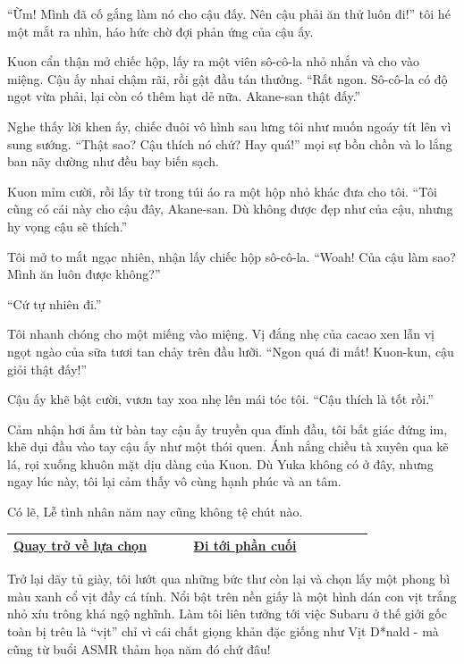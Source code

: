 \documentclass[../main.tex]{subfiles}
\begin{document}
``Ừm! Mình đã cố gắng làm nó cho cậu đấy. Nên cậu phải ăn thử luôn đi!'' tôi hé một mắt ra nhìn, háo hức chờ đợi phản ứng của cậu ấy.

Kuon cẩn thận mở chiếc hộp, lấy ra một viên sô-cô-la nhỏ nhắn và cho vào miệng. Cậu ấy nhai chậm rãi, rồi gật đầu tán thưởng. ``Rất ngon. Sô-cô-la có độ ngọt vừa phải, lại còn có thêm hạt dẻ nữa. Akane-san thật đấy.''

Nghe thấy lời khen ấy, chiếc đuôi vô hình sau lưng tôi như muốn ngoáy tít lên vì sung sướng. ``Thật sao? Cậu thích nó chứ? Hay quá!'' mọi sự bồn chồn và lo lắng ban nãy dường như đều bay biến sạch.

Kuon mỉm cười, rồi lấy từ trong túi áo ra một hộp nhỏ khác đưa cho tôi. ``Tôi cũng có cái này cho cậu đây, Akane-san. Dù không được đẹp như của cậu, nhưng hy vọng cậu sẽ thích.''

Tôi mở to mắt ngạc nhiên, nhận lấy chiếc hộp sô-cô-la. ``Woah! Của cậu làm sao? Mình ăn luôn được không?''

``Cứ tự nhiên đi.''

Tôi nhanh chóng cho một miếng vào miệng. Vị đắng nhẹ của cacao xen lẫn vị ngọt ngào của sữa tươi tan chảy trên đầu lưỡi. ``Ngon quá đi mất! Kuon-kun, cậu giỏi thật đấy!''

Cậu ấy khẽ bật cười, vươn tay xoa nhẹ lên mái tóc tôi. ``Cậu thích là tốt rồi.''

Cảm nhận hơi ấm từ bàn tay cậu ấy truyền qua đỉnh đầu, tôi bất giác đứng im, khẽ dụi đầu vào tay cậu ấy như một thói quen. Ánh nắng chiều tà xuyên qua kẽ lá, rọi xuống khuôn mặt dịu dàng của Kuon. Dù Yuka không có ở đây, nhưng ngay lúc này, tôi lại cảm thấy vô cùng hạnh phúc và an tâm.

Có lẽ, Lễ tình nhân năm nay cũng không tệ chút nào.

\begin{table}[H]
  \centering
  \setlength{\arrayrulewidth}{1pt}
  \begin{tabular}{|>{\centering\arraybackslash}p{0.4\linewidth}|>{\centering\arraybackslash}p{0.4\linewidth}|}
    \hline
    \hyperref[choice]{Quay trở về lựa chọn} & \hyperref[ending]{Đi tới phần cuối} \\ \hline
  \end{tabular}
\end{table}

\newpage
\label{kaoru}

Trở lại dãy tủ giày, tôi lướt qua những bức thư còn lại và chọn lấy một phong bì màu xanh cổ vịt đầy cá tính. Nổi bật trên nền giấy là một hình dán con vịt trắng nhỏ xíu trông khá ngộ nghĩnh. Làm tôi liên tưởng tới việc Subaru ở thế giới gốc toàn bị trêu là ``vịt'' chỉ vì cái chất giọng khản đặc giống như Vịt D*nald - mà cũng từ buổi ASMR thảm họa năm đó chứ đâu!
\end{document}
